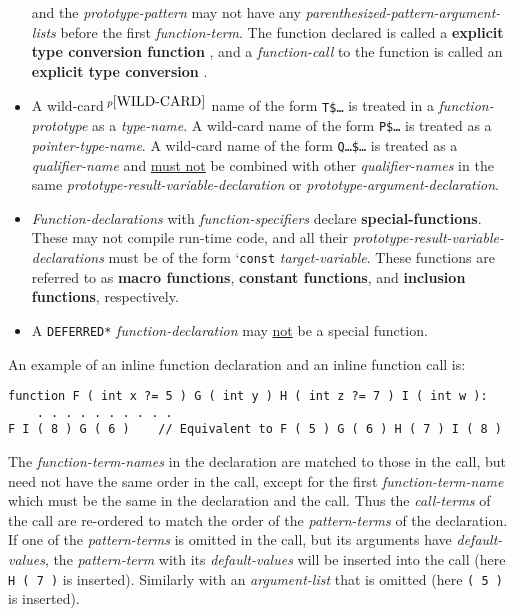 \documentclass[12pt]{article}
\newcommand{\key}[1]{{\rm \bfseries #1}}
\newcommand{\skey}[2]{{\rm \bfseries #1#2}}
\newcommand{\pagnote}[1]{$\,^{p\pageref{#1}}$}
\newenvironment{indpar}[1][0.3in]%
	{\begin{list}{}%
		     {\setlength{\itemsep}{0in}%
		      \setlength{\topsep}{0in}%
		      \setlength{\parsep}{1ex}%
		      \setlength{\labelwidth}{#1}%
		      \setlength{\leftmargin}{#1}%
		      \addtolength{\leftmargin}{\labelsep}}%
	 \item}%
	{\end{list}}
\begin{document}
\begin{itemize}
and the {\em prototype-pattern} may not have any
{\em parenthesized-pattern-argument-lists} before the first
{\em function-term}.  The function
declared is called a \key{explicit type conversion function}%
\label{EXPLICIT-TYPE-CONVERSION-FUNCTION}, and a {\em function-call}
to the function is called an \key{explicit type conversion}%
\label{EXPLICIT-TYPE-CONVERSION}.
\item
A wild-card\pagnote{WILD-CARD} name of the form {\tt T\$\ldots}
is treated in a {\em function-prototype} as a {\em type-name}.
A wild-card name of the form {\tt P\$\ldots} is treated as a
{\em pointer-type-name}.
A wild-card name of the form {\tt Q\ldots\$\ldots} is treated as a
{\em qualifier-name} and \underline{must not} be combined with
other {\em qualifier-names} in the same
{\em prototype-result-variable-declaration}
or {\em prototype-argument-declaration}.
\item
{\em Function-declarations} with {\em function-specifiers} declare
\skey{special-function}s.  These may not compile run-time code,
and all their {\em prototype-result-variable-declarations}
must be of the form `{\tt const} {\em target-variable}.
These functions are referred to as \skey{macro function}s,
\skey{constant function}s, and \skey{inclusion function}s, respectively.
\item
A {\tt *DEFERRED*} {\em function-declaration} may \underline{not} be
a special function.

\end{itemize}

An example of an inline function declaration and an inline function call is:
\begin{indpar}\begin{verbatim}
function F ( int x ?= 5 ) G ( int y ) H ( int z ?= 7 ) I ( int w ):
    . . . . . . . . . .
F I ( 8 ) G ( 6 )    // Equivalent to F ( 5 ) G ( 6 ) H ( 7 ) I ( 8 )
\end{verbatim}\end{indpar}

The {\em function-term-names} in the declaration are matched to those
in the call, but need not have the same order in the call, except for
the first {\em function-term-name} which must be the same in the
declaration and the call.  Thus the {\em call-terms} of the call
are re-ordered to match the order of the {\em pattern-terms} of the
declaration.  If one of the {\em pattern-terms} is omitted in the
call, but its arguments have {\em default-values},
the {\em pattern-term} with its
{\em default-values} will be inserted into the call
(here {\tt H ( 7 )} is inserted).
Similarly with an {\em argument-list} that is omitted
(here {\tt ( 5 )} is inserted).
\end{document}
